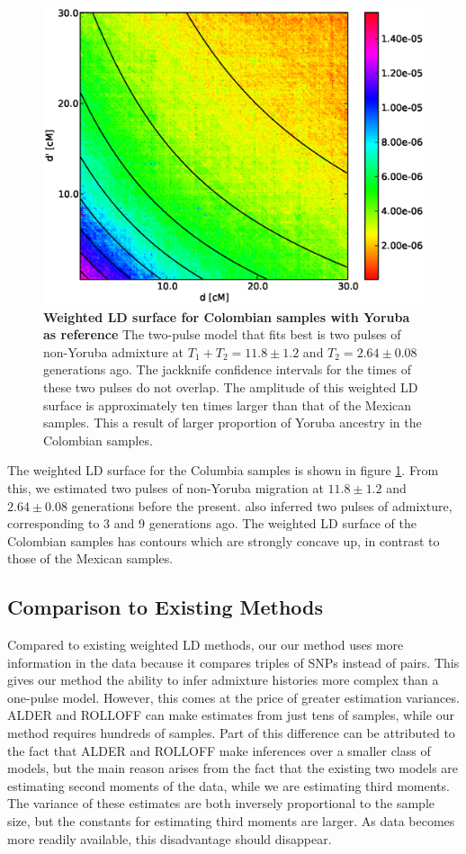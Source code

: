 \begin{figure}
\includegraphics[scale=.6]{CLM.eps}
\caption{
{\bf Weighted LD surface for Colombian samples with Yoruba as reference} The two-pulse model that fits best is two pulses of non-Yoruba admixture at $T_1+T_2=11.8\pm 1.2$ and $T_2=2.64 \pm 0.08$ generations ago. The jackknife confidence intervals for the times of these two pulses do not overlap. The amplitude of this weighted LD surface is approximately ten times larger than that of the Mexican samples. This a result of larger proportion of Yoruba ancestry in the Colombian samples.
}
\label{ASH_CLM}
\end{figure}

The weighted LD surface for the Columbia samples is shown in figure \ref{ASH_CLM}. From this, we estimated two pulses of non-Yoruba migration at $11.8\pm 1.2$ and $2.64\pm0.08$ generations before the present. \cite{gravel2013reconstructing} also inferred two pulses of admixture, corresponding to 3 and 9 generations ago. The weighted LD surface of the Colombian samples has contours which are strongly concave up, in contrast to those of the Mexican samples. 
\subsection{Comparison to Existing Methods}
Compared to existing weighted LD methods, our our method uses more information in the data because it compares triples of SNPs instead of pairs. This gives our method the ability to infer admixture histories more complex than a one-pulse model. However, this comes at the price of greater estimation variances. ALDER and ROLLOFF can make estimates from just tens of samples, while our method requires hundreds of samples. Part of this difference can be attributed to the fact that ALDER and ROLLOFF make inferences over a smaller class of models, but the main reason arises from the fact that the existing two models are estimating second moments of the data, while we are estimating third moments. The variance of these estimates are both inversely proportional to the sample size, but the constants for estimating third moments are larger. As data becomes more readily available, this disadvantage should disappear.

